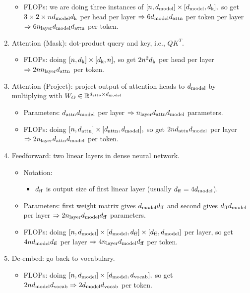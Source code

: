\begin{enumerate}
\begin{itemize}
            \item FLOPs: we are doing three instances of $[n, d_{\mathrm{model}}] \times [d_{\mathrm{model}} , d_{\mathrm{k}}],$ so get $3\times 2 \times nd_{\mathrm{model}} d_{\mathrm{k}}$ per head per layer $\Rightarrow 6d_{\mathrm{model}} d_{\mathrm{attn}}$ per token per layer $\Rightarrow 6n_{\mathrm{layer}} d_{\mathrm{model}} d_{\mathrm{attn}}$ per token.
        \end{itemize}
    \item Attention (Mask): dot-product query and key, i.e., $QK^T.$
        \begin{itemize}
            \item FLOPs: doing $[n, d_{\mathrm{k}}] \times [d_{\mathrm{k}}, n],$ so get $2n^2d_{\mathrm{k}}$ per head per layer $\Rightarrow 2nn_{\mathrm{layer}} d_{\mathrm{attn}}$ per token.
        \end{itemize}
    \item Attention (Project): project output of attention heads to $d_{\mathrm{model}}$ by multiplying with $W_O \in \mathbb{R}^{d_{\mathrm{attn}} \times d_{\mathrm{model}}}$
        \begin{itemize}
            \item Parameters: $d_{\mathrm{attn}} d_{\mathrm{model}}$ per layer $\Rightarrow n_{\mathrm{layer}} d_{\mathrm{attn}} d_{\mathrm{model}}$ parameters.
            \item FLOPs: doing $[n,d_{\mathrm{attn}}] \times [d_{\mathrm{attn}}, d_{\mathrm{model}}],$ so get $2nd_{\mathrm{attn}} d_{\mathrm{model}}$ per layer $\Rightarrow 2n_{\mathrm{layer}} d_{\mathrm{attn}} d_{\mathrm{model}}$ per token.
        \end{itemize}
    \item Feedforward: two linear layers in dense neural network.
        \begin{itemize}
            \item Notation:
            \begin{itemize}
                \item $d_{\mathrm{ff}}$ is output size of first linear layer (usually $d_{\mathrm{ff}} = 4d_{\mathrm{model}}$).
            \end{itemize}
            \item Parameters: first weight matrix gives $d_{\mathrm{model}} d_{\mathrm{ff}}$ and second gives $d_{\mathrm{ff}} d_{\mathrm{model}}$ per layer $\Rightarrow 2n_{\mathrm{layer}} d_{\mathrm{model}} d_{\mathrm{ff}}$ parameters.
            \item FLOPs: doing $[n, d_{\mathrm{model}}] \times [d_{\mathrm{model}}, d_{\mathrm{ff}}] \times [d_{\mathrm{ff}}, d_{\mathrm{model}}]$ per layer, so get $4nd_{\mathrm{model}} d_{\mathrm{ff}}$ per layer $\Rightarrow 4n_{\mathrm{layer}} d_{\mathrm{model}} d_{\mathrm{ff}}$ per token.
        \end{itemize}
    \item De-embed: go back to vocabulary.
        \begin{itemize}
            \item FLOPs: doing $[n, d_{\mathrm{model}}] \times [d_{\mathrm{model}}, d_{\mathrm{vocab}}],$ so get $2nd_{\mathrm{model}} d_{\mathrm{vocab}} \Rightarrow 2d_{\mathrm{model}} d_{\mathrm{vocab}}$ per token.
        \end{itemize}
\end{enumerate}
